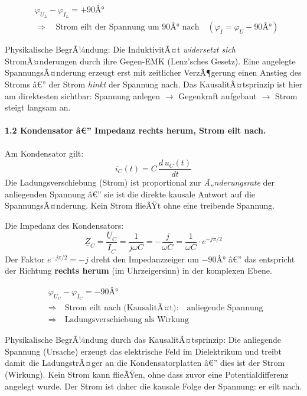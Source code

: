 ﻿\documentclass[12pt,a4paper,titlepage]{report}
\begin{document}
\begin{align}
	&\varphi_{U_L} - \varphi_{I_L} = +90Â° \\[4pt]
	&\Longrightarrow \quad
	\text{Strom eilt der Spannung um } 90Â° \text{ nach}
	\quad (\varphi_{I} = \varphi_{U} - 90Â°)
\end{align}

Physikalische BegrÃ¼ndung: Die InduktivitÃ¤t \emph{widersetzt sich} StromÃ¤nderungen durch
ihre Gegen-EMK (Lenz'sches Gesetz). Eine angelegte SpannungsÃ¤nderung erzeugt erst mit
zeitlicher VerzÃ¶gerung einen Anstieg des Stroms â€” der Strom \emph{hinkt} der Spannung
nach. Das KausalitÃ¤tsprinzip ist hier am direktesten sichtbar:
Spannung anlegen $\to$ Gegenkraft aufgebaut $\to$ Strom steigt langsam an.

\paragraph{1.2 \quad Kondensator â€” Impedanz rechts herum, Strom eilt nach.}

Am Kondensator gilt:
\[
	i_C(t) = C\,\frac{d\,u_C(t)}{dt}
\]
Die Ladungsverschiebung (Strom) ist proportional zur \emph{Ã„nderungsrate} der
anliegenden Spannung â€” sie ist die direkte kausale Antwort auf die SpannungsÃ¤nderung.
Kein Strom flieÃŸt ohne eine treibende Spannung.

Die Impedanz des Kondensators:
\[
	\underline{Z}_C = \frac{\underline{U}_C}{\underline{I}_C} = \frac{1}{j\omega C} = -\frac{j}{\omega C}
	= \frac{1}{\omega C}\cdot e^{-j\pi/2}
\]
Der Faktor $e^{-j\pi/2} = -j$ dreht den Impedanzzeiger um $-90Â°$ â€” das entspricht der
Richtung \textbf{rechts herum} (im Uhrzeigersinn) in der komplexen Ebene.

\begin{align}
	&\varphi_{U_C} - \varphi_{I_C} = -90Â° \\[4pt]
	&\Longrightarrow \quad
	\text{Strom eilt nach (KausalitÃ¤t):}
	\quad \text{anliegende Spannung} \;\\
	& \Longrightarrow \quad \text{Ladungsverschiebung als Wirkung}
\end{align}

Physikalische BegrÃ¼ndung durch das KausalitÃ¤tsprinzip:
Die anliegende Spannung (Ursache) erzeugt das elektrische Feld im Dielektrikum und
treibt damit die LadungstrÃ¤ger an die Kondensatorplatten â€” dies ist der Strom (Wirkung).
Kein Strom kann flieÃŸen, ohne dass zuvor eine Potentialdifferenz angelegt wurde.
Der Strom ist daher die kausale Folge der Spannung: er eilt nach.
\end{document}
